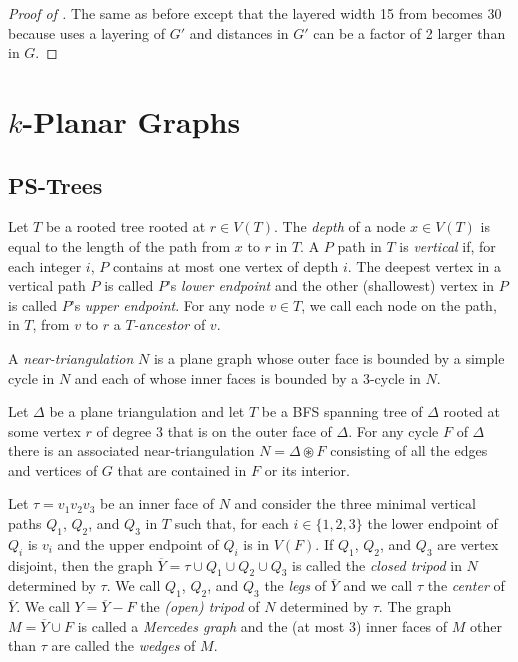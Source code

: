 \documentclass{patmorin}
\begin{document}
\begin{proof}[Proof of ]
  The same as before except that the layered width 15 from  becomes 30 because  uses a layering of $G'$ and distances in $G'$ can be a factor of 2 larger than in $G$.
\end{proof}

\section{$k$-Planar Graphs}

\subsection{PS-Trees}

Let $T$ be a rooted tree rooted at $r\in V(T)$. The \emph{depth} of a node $x\in V(T)$ is equal to the length of the path from $x$ to $r$ in $T$. A $P$ path in $T$ is \emph{vertical} if, for each integer $i$, $P$ contains at most one vertex of depth $i$.  The deepest vertex in a vertical path $P$ is called  $P$'s \emph{lower endpoint} and the other (shallowest) vertex in $P$ is called $P$'s \emph{upper endpoint}. For any node $v\in T$, we call each node on the path, in $T$, from $v$ to $r$ a \emph{$T$-ancestor} of $v$.

A \emph{near-triangulation} $N$ is a plane graph whose outer face is bounded by a simple cycle in $N$ and each of whose inner faces is bounded by a 3-cycle in $N$.  

Let $\Delta$ be a plane triangulation and let $T$ be a BFS spanning tree of $\Delta$ rooted at some vertex $r$ of degree 3 that is on the outer face of $\Delta$.  For any cycle $F$ of $\Delta$ there is an associated near-triangulation $N=\Delta\circledast F$ consisting of all the edges and vertices of $G$ that are contained in $F$ or its interior.

Let $\tau=v_1v_2v_3$ be an inner face of $N$ and consider the three minimal vertical paths $Q_1$, $Q_2$, and $Q_3$ in $T$ such that, for each $i\in\{1,2,3\}$ the lower endpoint of $Q_i$ is $v_i$ and the upper endpoint of $Q_i$ is in $V(F)$.  If $Q_1$, $Q_2$, and $Q_3$ are vertex disjoint, then the graph $\overline{Y}=\tau\cup Q_1\cup Q_2\cup Q_3$ is called the \emph{closed tripod} in $N$ determined by $\tau$.  We call $Q_1$, $Q_2$, and $Q_3$ the \emph{legs} of $\overline{Y}$ and we call $\tau$ the \emph{center} of $\overline{Y}$.  We call $Y=\overline{Y}-F$ the \emph{(open) tripod} of $N$ determined by $\tau$.  The graph $M=\overline{Y}\cup F$ is called a \emph{Mercedes graph} and the (at most 3) inner faces of $M$ other than $\tau$ are called the \emph{wedges} of $M$.
\end{document}
